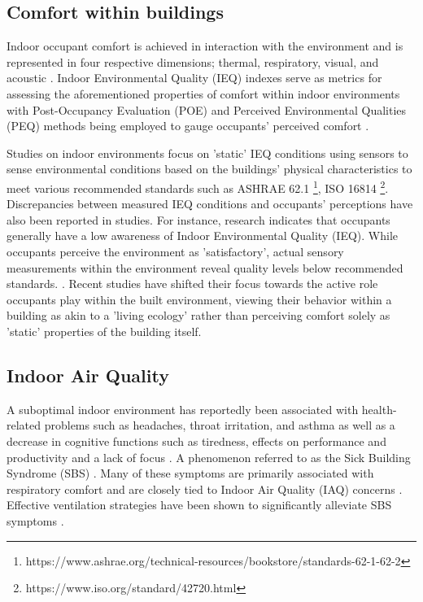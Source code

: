 \subsection{Comfort within buildings}
\label{sec:poe}

Indoor occupant comfort is achieved in interaction with the environment and is represented in four respective dimensions; thermal, respiratory, visual, and acoustic \cite{alavi_comfort_2017}. Indoor Environmental Quality (IEQ) \cite{kulshreshtha_indoor_2024} indexes serve as metrics for assessing the aforementioned properties of comfort within indoor environments with Post-Occupancy Evaluation (POE) \cite{elsayed_post-occupancy_2023} and Perceived Environmental Qualities (PEQ) \cite{son_perceived_2023} methods being employed to gauge occupants' perceived comfort \cite{boissonneault_concepts_2023}. 

Studies on indoor environments focus on 'static' IEQ conditions using sensors to sense environmental conditions based on the buildings' physical characteristics to meet various recommended standards such as ASHRAE 62.1 \footnote{https://www.ashrae.org/technical-resources/bookstore/standards-62-1-62-2}, ISO 16814 \footnote{https://www.iso.org/standard/42720.html}. Discrepancies between measured IEQ conditions and occupants' perceptions have also been reported in studies. For instance, research indicates that occupants generally have a low awareness of Indoor Environmental Quality (IEQ). While occupants perceive the environment as 'satisfactory', actual sensory measurements within the environment reveal quality levels below recommended standards. \cite{son_perceived_2023}. Recent studies have shifted their focus towards the active role occupants play within the built environment, viewing their behavior within a building as akin to a 'living ecology' \cite{langevin_quantifying_2016} rather than perceiving comfort solely as 'static' properties of the building itself. 


\subsection{Indoor Air Quality}
\label{sec:iaq}

A suboptimal indoor environment has reportedly been associated with health-related problems such as headaches, throat irritation, and asthma \cite{klepeis_national_2001} as well as a decrease in cognitive functions such as tiredness, effects on performance and productivity and a lack of focus \cite{wang_how_2021} \cite{du_indoor_2020}. A phenomenon referred to as the Sick Building Syndrome (SBS) \cite{gawande_indoor_2020, passarelli_sick_2009}. Many of these symptoms are primarily associated with respiratory comfort and are closely tied to Indoor Air Quality (IAQ) concerns \cite{kim_analyzing_2019}. Effective ventilation strategies have been shown to significantly alleviate SBS symptoms \cite{gawande_indoor_2020}.


